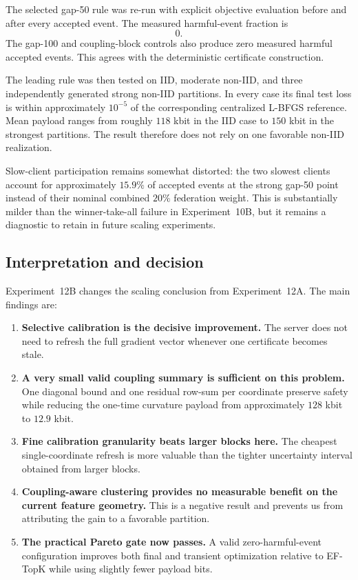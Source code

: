The selected gap-50 rule was re-run with explicit objective evaluation before and after every accepted event. The measured harmful-event fraction is
\begin{equation}
 \boxed{0.}
\end{equation}
The gap-100 and coupling-block controls also produce zero measured harmful accepted events. This agrees with the deterministic certificate construction.

The leading rule was then tested on IID, moderate non-IID, and three independently generated strong non-IID partitions. In every case its final test loss is within approximately $10^{-5}$ of the corresponding centralized L-BFGS reference. Mean payload ranges from roughly $118$ kbit in the IID case to $150$ kbit in the strongest partitions. The result therefore does not rely on one favorable non-IID realization.

Slow-client participation remains somewhat distorted: the two slowest clients account for approximately $15.9\%$ of accepted events at the strong gap-50 point instead of their nominal combined $20\%$ federation weight. This is substantially milder than the winner-take-all failure in Experiment~10B, but it remains a diagnostic to retain in future scaling experiments.

\subsection{Interpretation and decision}

Experiment~12B changes the scaling conclusion from Experiment~12A. The main findings are:
\begin{enumerate}
 \item \textbf{Selective calibration is the decisive improvement.} The server does not need to refresh the full gradient vector whenever one certificate becomes stale.
 \item \textbf{A very small valid coupling summary is sufficient on this problem.} One diagonal bound and one residual row-sum per coordinate preserve safety while reducing the one-time curvature payload from approximately $128$ kbit to $12.9$ kbit.
 \item \textbf{Fine calibration granularity beats larger blocks here.} The cheapest single-coordinate refresh is more valuable than the tighter uncertainty interval obtained from larger blocks.
 \item \textbf{Coupling-aware clustering provides no measurable benefit on the current feature geometry.} This is a negative result and prevents us from attributing the gain to a favorable partition.
 \item \textbf{The practical Pareto gate now passes.} A valid zero-harmful-event configuration improves both final and transient optimization relative to EF-TopK while using slightly fewer payload bits.
\end{enumerate}

